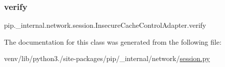 \subsubsection{\texorpdfstring{verify}{verify}}
{\footnotesize\ttfamily pip.\+\_\+internal.\+network.\+session.\+Insecure\+Cache\+Control\+Adapter.\+verify\hspace{0.3cm}{\ttfamily [static]}}



The documentation for this class was generated from the following file\+:\begin{DoxyCompactItemize}
\item 
venv/lib/python3./site-\/packages/pip/\+\_\+internal/network/\hyperlink{session_8py}{session.\+py}\end{DoxyCompactItemize}

